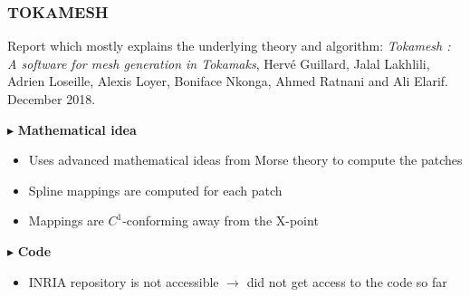 \documentclass[t,10pt,a3paper]{beamer} %
\begin{document}
\begin{frame} %
\frametitle{\color{vert}\textbf{TOKAMESH}}
\footnotesize	

\vspace*{0.25cm}
Report which mostly explains the underlying theory and algorithm: 
\textit{Tokamesh : A software for mesh generation in Tokamaks}, 
Hervé Guillard, Jalal Lakhlili, Adrien Loseille, Alexis Loyer, Boniface Nkonga, Ahmed Ratnani and Ali Elarif. December 2018. 
\vspace*{0.5 cm}

{\color{vert}$\blacktriangleright$ }
\textbf{Mathematical idea}
\begin{itemize}
	\item Uses advanced mathematical ideas from Morse theory to compute the patches
	\item Spline mappings are computed for each patch
	\item Mappings are $C^1$-conforming away from the X-point
\end{itemize}

{\color{vert}$\blacktriangleright$ }
\textbf{Code}

\begin{itemize}
	\item INRIA repository is not accessible $\rightarrow$ did not get access to the code so far
\end{itemize}

\end{frame}
\end{document}
